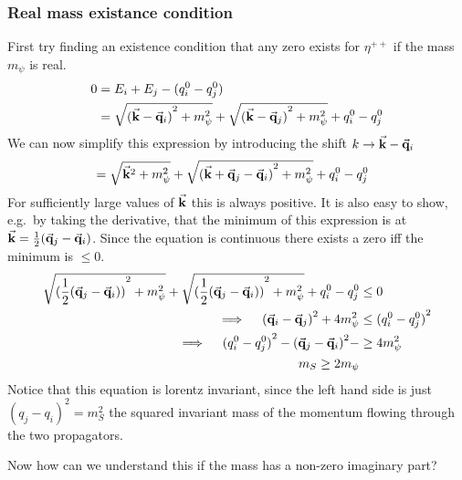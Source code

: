 \subsubsection{Real mass existance condition}
First try finding an existence condition that any zero exists for $\eta^{++}$ if the mass $m_\psi$ is real.
\begin{align}
    0 &= E_i + E_j - (q^0_i - q^0_j)\\
    &= \sqrt{{(\va{k}-\va{q}_i)}^2+m_\psi^2} + \sqrt{{(\va{k}-\va{q}_j)}^2+m_\psi^2} + q^0_i - q^0_j\\
\end{align}
We can now simplify this expression by introducing the shift $k \to \va{k} - \va{q}_i$
\begin{align}
    &= \sqrt{\va{k}^2+m_\psi^2} + \sqrt{{(\va{k}+\va{q}_j-\va{q}_i)}^2+m_\psi^2} + q^0_i - q^0_j
\end{align}
For sufficiently large values of $\va{k}$ this is always positive. It is also easy to show, e.g.\ by taking the derivative, that the minimum of this expression is at $\va{k} = \frac{1}{2} (\va{q}_j-\va{q}_i)$. Since the equation is continuous there exists a zero iff the minimum is $\leq 0$.
\begin{align}
    \sqrt{{(\frac{1}{2} (\va{q}_j-\va{q}_i))}^2+m_\psi^2} + \sqrt{{(\frac{1}{2}(\va{q}_j-\va{q}_i))}^2+m_\psi^2} + q^0_i - q^0_j &\leq 0\\
    \implies\quad {(\va{q}_i-\va{q}_j)}^2 + 4 m_\psi^2 &\leq {(q^0_i - q^0_j)}^2\\
    \implies\quad {(q^0_i - q^0_j)}^2 - {(\va{q}_j-\va{q}_i)}^2 -  &\geq 4 m_\psi^2\\
    m_S \geq 2 m_\psi
\end{align}
Notice that this equation is lorentz invariant, since the left hand side is just ${(q_j - q_i)}^2 = m_S^2$ the squared invariant mass of the momentum flowing through the two propagators.

Now how can we understand this if the mass has a non-zero imaginary part?